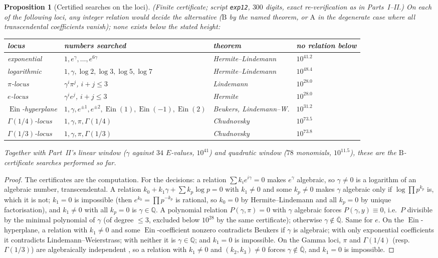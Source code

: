 \documentclass[11pt,a4paper]{article}
\newcommand{\Q}{\mathbb Q}
\newcommand{\Qbar}{\overline{\mathbb Q}}
\newcommand{\Ein}{\operatorname{Ein}}
\newtheorem{proposition}[theorem]{Proposition}
\theoremstyle{definition}
\theoremstyle{remark}
\numberwithin{equation}{section}
\begin{document}
\begin{proposition}[Certified searches on the loci]\label{IV:prop:zoo}
\textup{(Finite certificate; script \texttt{exp12}, $300$ digits, exact re-verification as
in Parts~I--II.)} On each of the following loci, any integer relation would decide the
alternative ($\mathrm B$ by the named theorem, or $\mathrm A$ in the degenerate case where
all transcendental coefficients vanish); none exists below the stated height:
\begin{center}\footnotesize
\begin{tabular}{@{}llll@{}}
\toprule
locus & numbers searched & theorem & no relation below\\
\midrule
exponential & $1,e^\gamma,\dots,e^{6\gamma}$ & Hermite--Lindemann & $10^{41.2}$\\
logarithmic & $1,\gamma,\log2,\log3,\log5,\log7$ & Hermite--Lindemann & $10^{48.4}$\\
$\pi$-locus & $\gamma^i\pi^j$, $i+j\le3$ & Lindemann & $10^{28.0}$\\
$e$-locus & $\gamma^ie^j$, $i+j\le3$ & Hermite & $10^{28.0}$\\
$\Ein$-hyperplane & $1,\gamma,e^{\pm1},e^{\pm2},\Ein(1),\Ein(-1),\Ein(2)$ & Beukers, Lindemann--W. & $10^{31.2}$\\
$\Gamma(1/4)$-locus & $1,\gamma,\pi,\Gamma(1/4)$ & Chudnovsky & $10^{73.5}$\\
$\Gamma(1/3)$-locus & $1,\gamma,\pi,\Gamma(1/3)$ & Chudnovsky & $10^{73.8}$\\
\bottomrule
\end{tabular}
\end{center}
Together with Part~II's linear window ($\gamma$ against $34$ $E$-values, $10^{41}$) and
quadratic window ($78$ monomials, $10^{11.5}$), these are the $\mathrm B$-certificate
searches performed so far.
\end{proposition}
\begin{proof}
The certificates are the computation. For the decisions: a relation
$\sum k_ie^{i\gamma}=0$ makes $e^\gamma$ algebraic, so $\gamma\ne0$ is a logarithm of an
algebraic number, transcendental. A relation $k_0+k_1\gamma+\sum k_p\log p=0$ with
$k_1\ne0$ and some $k_p\ne0$ makes $\gamma$ algebraic only if $\log\prod p^{k_p}$ is,
which it is not; $k_1=0$ is impossible (then $e^{k_0}=\prod p^{-k_p}$ is rational, so
$k_0=0$ by Hermite--Lindemann and all $k_p=0$ by unique factorisation), and $k_1\ne0$ with
all $k_p=0$ is $\gamma\in\Q$.
A polynomial relation $P(\gamma,\pi)=0$ with $\gamma$ algebraic forces $P(\gamma,y)\equiv0$,
i.e.\ $P$ divisible by the minimal polynomial of $\gamma$ (of degree $\le3$, excluded below
$10^{28}$ by the same certificate); otherwise $\gamma\notin\Qbar$. Same for $e$. On the
$\Ein$-hyperplane, a relation with $k_1\ne0$ and some $\Ein$-coefficient nonzero
contradicts Beukers if $\gamma$ is algebraic; with only exponential coefficients it
contradicts Lindemann--Weierstrass; with neither it is $\gamma\in\Q$; and $k_1=0$ is
impossible. On the Gamma loci, $\pi$ and $\Gamma(1/4)$ (resp.\ $\Gamma(1/3)$) are
algebraically independent \cite{Chudnovsky}, so a relation with $k_1\ne0$ and
$(k_2,k_3)\ne0$ forces $\gamma\notin\Qbar$, and $k_1=0$ is impossible.
\end{proof}
\end{document}
